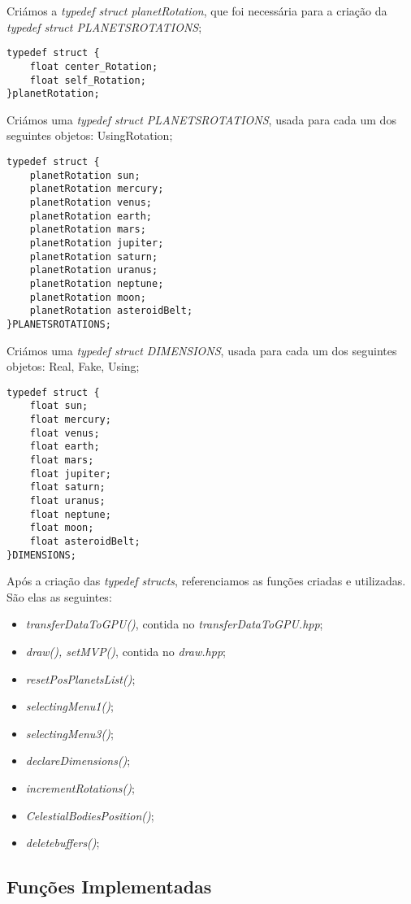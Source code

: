 Criámos a \textit{typedef struct planetRotation}, que foi necessária para a criação da \textit{typedef struct PLANETSROTATIONS};
\begin{lstlisting}[caption= \textit{typedef struct planetRotation}.]
typedef struct {
	float center_Rotation;
	float self_Rotation;
}planetRotation;
\end{lstlisting}

Criámos uma \textit{typedef struct PLANETSROTATIONS}, usada para cada um dos seguintes objetos: UsingRotation;
\begin{lstlisting}[caption= \textit{typedef struct PLANETSROTATIONS}.]
typedef struct {
	planetRotation sun;
	planetRotation mercury;
	planetRotation venus;
	planetRotation earth;
	planetRotation mars;
	planetRotation jupiter;
	planetRotation saturn;
	planetRotation uranus;
	planetRotation neptune;
	planetRotation moon;
	planetRotation asteroidBelt;
}PLANETSROTATIONS;
\end{lstlisting}

Criámos uma \textit{typedef struct DIMENSIONS}, usada para cada um dos seguintes objetos: Real, Fake, Using;
\begin{lstlisting}[caption= \textit{typedef struct DIMENSIONS}.]
typedef struct {
	float sun;
	float mercury;
	float venus;
	float earth;
	float mars;
	float jupiter;
	float saturn;
	float uranus;
	float neptune;
	float moon;
	float asteroidBelt;
}DIMENSIONS;
\end{lstlisting}

Após a criação das \textit{typedef structs}, referenciamos as funções criadas e utilizadas.
São elas as seguintes:
\begin{itemize}
\item \textit{transferDataToGPU()}, contida no \textit{transferDataToGPU.hpp};
\item \textit{draw(), setMVP()}, contida no \textit{draw.hpp};
\item \textit{resetPosPlanetsList()};
\item \textit{selectingMenu1()};
\item \textit{selectingMenu3()};
\item \textit{declareDimensions()};
\item \textit{incrementRotations()};
\item \textit{CelestialBodiesPosition()};
\item \textit{deletebuffers()};
\end{itemize}

\subsection{Funções Implementadas}
